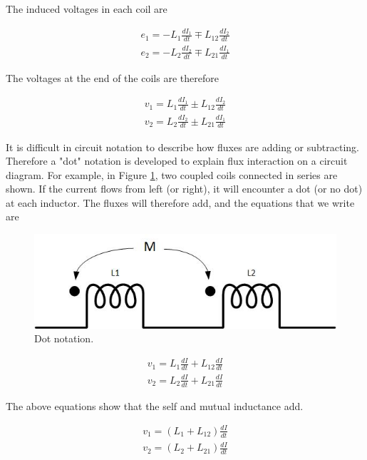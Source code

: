 \documentclass{ximera}
\begin{document}
The induced voltages in each coil are


\begin{eqnarray}
e_1=  -L_1 \frac{dI_1}{dt} \mp L_{12} \frac{dI_2}{dt} \\
e_2= - L_2 \frac{dI_2}{dt} \mp L_{21} \frac{dI_1}{dt}
\end{eqnarray}

The voltages at the end of the coils are therefore


\begin{eqnarray}
v_1=  L_1 \frac{dI_1}{dt} \pm L_{12} \frac{dI_2}{dt} \\
v_2= L_2 \frac{dI_2}{dt} \pm L_{21} \frac{dI_1}{dt}
\end{eqnarray}


It is difficult in circuit notation to describe how fluxes are adding or subtracting. Therefore a "dot" notation is developed to explain flux interaction on a circuit diagram. For example, in Figure \ref{fig:DotNotation1}, two coupled coils connected in series are shown. If the current flows from left (or right), it will encounter a dot (or no dot) at each inductor. The fluxes will therefore add, and the equations that we write are

 
\begin{figure}[htbp]
\begin{center}
\includegraphics[scale=0.8]{../jpg/CoupledCoilsCircuit.jpg}
\end{center}
\caption{Dot notation.}
\label{fig:DotNotation1}
\end{figure}





\begin{eqnarray}
v_1=  L_1 \frac{dI}{dt} + L_{12} \frac{dI}{dt} \\
v_2= L_2 \frac{dI}{dt} + L_{21} \frac{dI}{dt}
\end{eqnarray}

The above equations show that the self and mutual inductance add.


\begin{eqnarray}
v_1=  (L_1  + L_{12}) \frac{dI}{dt} \\
v_2= (L_2 + L_{21}) \frac{dI}{dt}
\end{eqnarray}
\end{document}
